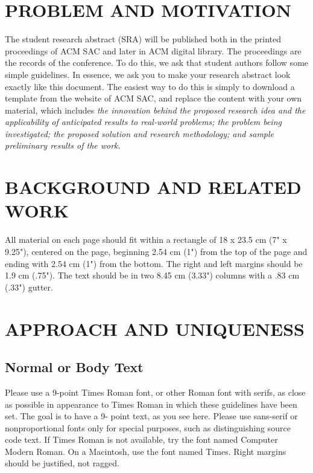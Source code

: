 \documentclass[sigconf]{acmart}
\begin{document}


\maketitle

\section*{PROBLEM AND MOTIVATION}
The student research abstract (SRA) will be published both in the
printed proceedings of ACM SAC and later in ACM digital
library. The proceedings are the records of the conference. To do
this, we ask that student authors follow some simple guidelines. In
essence, we ask you to make your research abstract look exactly
like this document. The easiest way to do this is simply to
download a template from the website of ACM SAC, and replace
the content with your own material, which includes \emph{the innovation
behind the proposed research idea and the applicability of
anticipated results to real-world problems; the problem being
investigated; the proposed solution and research methodology;
and sample preliminary results of the work.}

\section*{BACKGROUND AND RELATED WORK}
All material on each page should fit within a rectangle of 18 x
23.5 cm (7" x 9.25"), centered on the page, beginning 2.54 cm
(1") from the top of the page and ending with 2.54 cm (1") from
the bottom. The right and left margins should be 1.9 cm (.75").
The text should be in two 8.45 cm (3.33") columns with a .83 cm
(.33") gutter.

\section*{APPROACH AND UNIQUENESS}
\subsection*{Normal or Body Text}
Please use a 9-point Times Roman font, or other Roman font with
serifs, as close as possible in appearance to Times Roman in
which these guidelines have been set. The goal is to have a 9-
point text, as you see here. Please use sans-serif or nonproportional
fonts only for special purposes, such as
distinguishing source code text. If Times Roman is not available,
try the font named Computer Modern Roman. On a Macintosh,
use the font named Times. Right margins should be justified, not
ragged.
\end{document}
